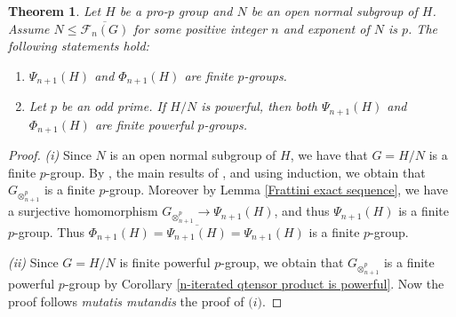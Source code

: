 \documentclass[12pt]{elsarticle}
\newtheorem{theorem}{Theorem}[section]
\newtheorem*{main corollary*}{Main Corollary}
\theoremstyle{definition}
\begin{document}
 \begin{theorem} \label{Frattini is finite powerful}
Let $H$ be a  pro-$p$ group and $N$ be an open normal subgroup of $H$. Assume $N\leqslant \overline{\mathcal{F}_n(G)}$ for some positive integer $n$ and exponent of $N$ is $p$. The following statements hold:
\begin{enumerate}
    \item [(i)] $\Psi_{n+1}(H)$ and $\Phi_{n+1}(H)$ are finite $p$-groups. 
 \item [(ii)] Let $p$ be an odd prime. If  $H/N$ is powerful, then both $\Psi_{n+1}(H)$ and $\Phi_{n+1}(H)$ are finite powerful $p$-groups.
\end{enumerate}
\end{theorem}
\begin{proof}
\textit{(i)} Since $N$ is an open normal subgroup of $H$, we have that  $G=H/N$ is a finite $p$-group. By \cite[Corollary 12]{MR1088877}, the main results of \cite{E87}, and using induction, we obtain that $G_{\otimes^{p}_{n+1}}$ is a finite $p$-group. Moreover by Lemma \ref{Frattini exact sequence}, we have a surjective homomorphism $G_{\otimes^{p}_{n+1}}\to \Psi_{n+1}(H)$, and thus $\Psi_{n+1}(H)$ is a finite $p$-group. Thus ${\Phi_{n+1}(H)=\overline{\Psi_{n+1}(H)}=\Psi_{n+1}(H)}$ is a finite $p$-group.
\par\textit{(ii)} Since $G=H/N$ is finite powerful $p$-group, we obtain that $G_{\otimes^{p}_{n+1}}$ is a finite powerful $p$-group by Corollary \ref{n-iterated qtensor product is powerful}. Now the proof follows \textit{mutatis mutandis} the proof of $\textit{(i)}$.
\end{proof}
\end{document}
